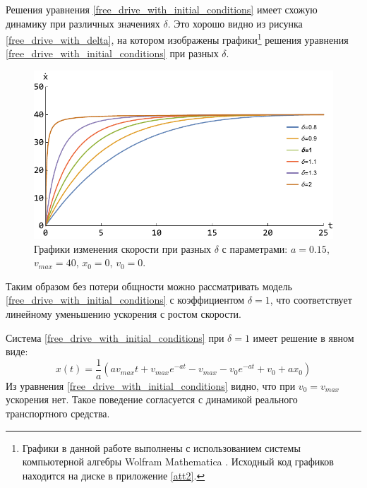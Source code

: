 \documentclass[12pt, a4paper]{extarticle}
\numberwithin{equation}{section}
\numberwithin{figure}{section}
\begin{document}
Решения уравнения \eqref{free_drive_with_initial_conditions} имеет схожую динамику при различных значениях $\delta$. Это хорошо видно из рисунка \eqref{free_drive_with_delta}, на котором изображены графики\footnote{Графики в данной работе выполнены с использованием системы компьютерной алгебры Wolfram Mathematica \cite{WolframMathematica}. Исходный код графиков находится на диске в приложение \ref{att2}.} решения уравнения \eqref{free_drive_with_initial_conditions} при разных $\delta$.

\begin{figure}[h!]
	\begin{center}
		\begin{minipage}[h!]{0.48\linewidth}
			\includegraphics[width=1\linewidth,height=0.2\textheight]
			{Images/free_drive_speed_with_different_delta.pdf}
		\end{minipage}
		\caption{Графики изменения скорости при разных $\delta$ с параметрами: $a=0.15$, $v_{max}=40$, $x_0=0$, $v_0=0$.}
		\label{free_drive_with_delta}
	\end{center}
\end{figure}

Таким образом без потери общности можно рассматривать модель \eqref{free_drive_with_initial_conditions} с коэффициентом $\delta=1$, что соответствует линейному уменьшению ускорения с ростом скорости.

Система \eqref{free_drive_with_initial_conditions} при $\delta=1$ имеет решение в явном виде:
\begin{equation*}
x(t) =\dfrac{1}{a}\left(av_{max}t+v_{max}e^{-at}-v_{max}-v_0e^{-at}+v_0+ax_0\right) 
\end{equation*}
Из уравнения \eqref{free_drive_with_initial_conditions} видно, что при $v_0=v_{max}$ ускорения нет. Такое поведение согласуется с динамикой реального транспортного средства.
\end{document}
